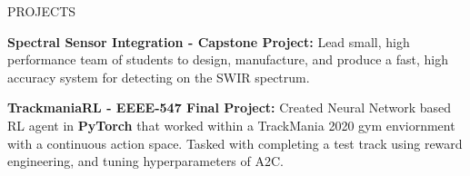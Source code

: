 \documentclass{resume} %
\begin{document}

\begin{rSection}{PROJECTS}
\vspace{-0.75em}
\item \textbf{Spectral Sensor Integration - Capstone Project:} {Lead small, high performance team of students to design, manufacture, and produce a fast, high accuracy system for detecting on the SWIR spectrum.}
\item \textbf{TrackmaniaRL - EEEE-547 Final Project:} {Created Neural Network based RL agent in \textbf{PyTorch} that worked within a TrackMania 2020 gym enviornment with a continuous action space.
Tasked with completing a test track using reward engineering, and tuning hyperparameters of A2C.}
\end{rSection} 
\end{document}
